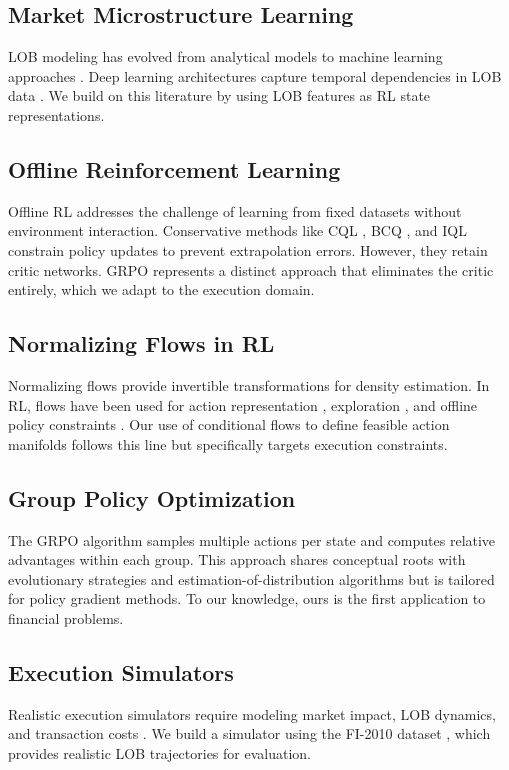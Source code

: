 \documentclass{article}
\begin{document}
\subsection{Market Microstructure Learning}
LOB modeling has evolved from analytical models \citep{cont2010stochastic} to machine learning approaches \citep{tsantekidis2020deep}. Deep learning architectures capture temporal dependencies in LOB data \citep{zhang2021temporal}. We build on this literature by using LOB features as RL state representations.

\subsection{Offline Reinforcement Learning}
Offline RL addresses the challenge of learning from fixed datasets without environment interaction. Conservative methods like CQL \citep{kumar2020conservative}, BCQ \citep{fujimoto2019off}, and IQL \citep{kostrikov2022offline} constrain policy updates to prevent extrapolation errors. However, they retain critic networks. GRPO \citep{deepseek2024grpo} represents a distinct approach that eliminates the critic entirely, which we adapt to the execution domain.

\subsection{Normalizing Flows in RL}
Normalizing flows \citep{rezende2015variational} provide invertible transformations for density estimation. In RL, flows have been used for action representation \citep{ward2020improving}, exploration \citep{mazoure2020deep}, and offline policy constraints \citep{siegel2020keep}. Our use of conditional flows to define feasible action manifolds follows this line but specifically targets execution constraints.

\subsection{Group Policy Optimization}
The GRPO algorithm \citep{deepseek2024grpo} samples multiple actions per state and computes relative advantages within each group. This approach shares conceptual roots with evolutionary strategies \citep{salimans2017evolution} and estimation-of-distribution algorithms but is tailored for policy gradient methods. To our knowledge, ours is the first application to financial problems.

\subsection{Execution Simulators}
Realistic execution simulators require modeling market impact, LOB dynamics, and transaction costs \citep{bacry2015hawkes, donier2015won}. We build a simulator using the FI-2010 dataset \citep{nystrom2014high}, which provides realistic LOB trajectories for evaluation.
\end{document}
